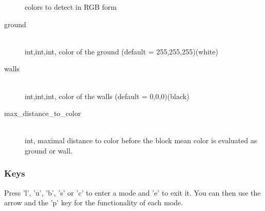 \begin{description}
                colors to detect in RGB form
            \item[ground] \hfill \\ int,int,int, color of the ground 
                (default = 255,255,255)(white)
            \item[walls] \hfill \\ int,int,int, color of the walls 
                (default = 0,0,0)(black)
            \item[max\_distance\_to\_color] \hfill \\ int, maximal 
                distance to color before the block mean color
                is evaluated as ground or wall.
        \end{description}

    \subsubsection{Keys}
    \label{sec:md:howto:keys}

Press 'l', 'u', 'b', 's' or 'c' to enter a mode and 'e' to exit it. You can
then use the arrow and the 'p' key for the functionality of each mode.

